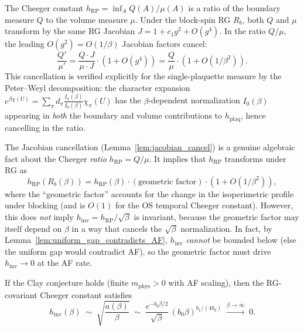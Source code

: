 \begin{lemma}
\label{lem:jacobian_cancel}
The Cheeger constant $h_{\mathrm{RP}}=\inf_{A}Q(A)/\mu(A)$ is a
ratio of the boundary measure $Q$ to the volume measure $\mu$.
Under the block-spin RG $R_{b}$, both $Q$ and $\mu$ transform by
the same RG Jacobian $J=1+c_{1}g^{2}+O(g^{4})$. In the ratio
$Q/\mu$, the leading $O(g^{2})=O(1/\beta)$ Jacobian factors
cancel:
\begin{equation}
\label{eq:jacobian_cancel}
  \frac{Q'}{\mu'}=\frac{Q\cdot J}{\mu\cdot J}\cdot(1+O(g^{4}))
  =\frac{Q}{\mu}\cdot(1+O(1/\beta^{2})).
\end{equation}
This cancellation is verified explicitly for the single-plaquette
measure by the Peter--Weyl decomposition: the character expansion
$e^{\beta\chi(U)}=\sum_{\pi}d_{\pi}\frac{I_{\pi}(\beta)}{I_{0}(\beta)}
\chi_{\pi}(U)$ has the $\beta$-dependent normalization
$I_{0}(\beta)$ appearing in \emph{both} the boundary and volume
contributions to $h_{\mathrm{plaq}}$, hence cancelling in the
ratio.
\end{lemma}

\begin{remark}
\label{rem:jacobian_scope}
The Jacobian cancellation (Lemma~\ref{lem:jacobian_cancel}) is a
genuine algebraic fact about the Cheeger \emph{ratio}
$h_{\mathrm{RP}}=Q/\mu$. It implies that $h_{\mathrm{RP}}$
transforms under RG as
\begin{equation}
\label{eq:h_rp_transform}
  h_{\mathrm{RP}}(R_{b}(\beta))
  =h_{\mathrm{RP}}(\beta)\cdot(\text{geometric factor})\cdot
  (1+O(1/\beta^{2})),
\end{equation}
where the ``geometric factor'' accounts for the change in the
isoperimetric profile under blocking (and is $O(1)$ for the OS
temporal Cheeger constant). However, this does \emph{not} imply
$h_{\mathrm{inv}}=h_{\mathrm{RP}}/\sqrt{\beta}$ is invariant,
because the geometric factor may itself depend on $\beta$ in a
way that cancels the $\sqrt{\beta}$ normalization. In fact, by
Lemma~\ref{lem:uniform_gap_contradicts_AF}, $h_{\mathrm{inv}}$
\emph{cannot} be bounded below (else the uniform gap would
contradict AF), so the geometric factor must drive
$h_{\mathrm{inv}}\to0$ at the AF rate.
\end{remark}

\begin{theorem}
\label{thm:h_inv_af_scaling}
If the Clay conjecture holds (finite $m_{\mathrm{phys}}>0$ with
AF scaling), then the RG-covariant Cheeger constant satisfies
\begin{equation}
\label{eq:h_inv_af_scaling}
  h_{\mathrm{inv}}(\beta)\;\sim\;\sqrt{\frac{a(\beta)}{\beta}}
  \;\sim\;\frac{e^{-b_{0}\beta/2}}{\sqrt{\beta}}\,(b_{0}\beta)^{b_{1}/(4b_{0})}
  \;\xrightarrow{\beta\to\infty}\;0.
\end{equation}
\end{theorem}

